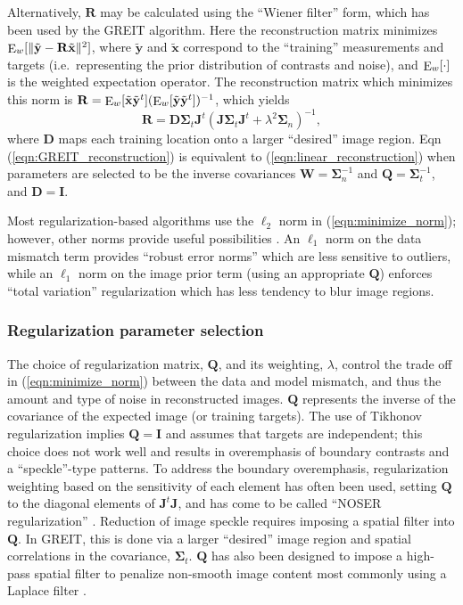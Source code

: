 \documentclass[12pt]{article} \usepackage[margin=3cm]{geometry} \usepackage[margin=20pt,font=small,labelfont=bf]{caption}\def\TBLWIDA{35mm}\def\TBLWIDB{95mm}
\newcommand{\xT}{\tilde{\mathbf{x}}}
\newcommand{\yT}{\tilde{\mathbf{y}}}
\newcommand{\DB}{\mathbf{D}}
\newcommand{\IB}{\mathbf{I}}
\newcommand{\RB}{\mathbf{R}}
\newcommand{\QB}{\mathbf{Q}}
\newcommand{\WB}{\mathbf{W}}
\newcommand{\JB}{\mathbf{J}}
\newcommand{\SG}{\bm{\Sigma}}
\newcommand{\Ew}{\mathop{\rm E}_w}
\begin{document}
Alternatively, $\RB$ may be calculated using the ``Wiener filter'' form,
which has been used by the GREIT \cite{Adler2009GREIT} algorithm. Here the
reconstruction matrix minimizes 
$\Ew[\|\yT - \RB \xT\|^2]$, where 
$\yT$ and $\xT$ correspond to the ``training'' measurements and targets
(i.e.\ representing the prior distribution of contrasts and noise), and
$\Ew[\cdot]$ is the weighted expectation operator. The reconstruction
matrix which minimizes this norm is
$\RB = \Ew[ \xT \yT^t] (\Ew[ \yT \yT^t ])^{-1}$,
which yields \cite{Grychtol20163DEIT}
\begin{equation}
\RB= \DB \SG_t \JB^t \left( \JB \SG_t \JB^t + \lambda^2 \SG_n \right)^{-1},
\label{eqn:GREIT_reconstruction}
\end{equation}
where $\DB$ maps each training location onto
a larger ``desired'' image region.
Eqn (\ref{eqn:GREIT_reconstruction}) is equivalent to 
    (\ref{eqn:linear_reconstruction}) when parameters are
selected to be the inverse covariances
$\WB = \SG_n^{-1}$ and 
$\QB = \SG_t^{-1}$, and $\DB= \IB$.

Most regularization-based algorithms use the $\ell_2$ norm in
(\ref{eqn:minimize_norm}); however, other norms
provide useful possibilities \cite{Borsic2012PDIPM}.
An $\ell_1$ norm on the 
data mismatch term provides ``robust error norms'' which
are less sensitive to outliers, while 
an $\ell_1$ norm on the image prior term (using an appropriate $\QB$)
enforces ``total variation'' regularization which has
less tendency to blur image regions.

\subsubsection{Regularization parameter selection}

The choice of regularization matrix, $\QB$, and its weighting, $\lambda$,
control the trade off in (\ref{eqn:minimize_norm}) between the
data and model mismatch, and thus the amount and type of noise
in reconstructed images. $\QB$ represents the inverse of the
covariance of the expected image (or training targets). The use
of Tikhonov regularization implies $\QB=\IB$ and assumes that
targets are independent; this choice does not work well and
results in overemphasis of boundary contrasts and a ``speckle''-type
patterns. To address the boundary overemphasis,
 regularization weighting based on the sensitivity of each element has often
been used, setting $\QB$ to the diagonal elements of $\JB^t \JB$, and has come
to be called ``NOSER regularization'' \cite{Cheney1990NOSER}.
Reduction of image speckle requires imposing a spatial filter
into $\QB$. In GREIT, this is done via a larger ``desired'' image
region and spatial correlations in the covariance, $\SG_t$. 
$\QB$ has also been designed to impose a 
high-pass spatial filter
to penalize non-smooth image content \cite{Borsic2002Anisotropic}
most commonly using a Laplace filter \cite{Polydorides2002EIDORS}.
\end{document}
